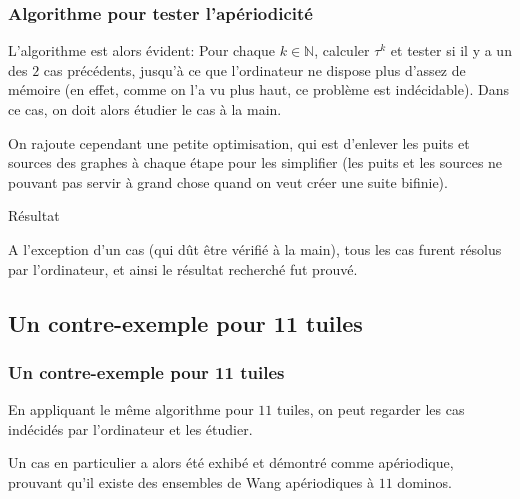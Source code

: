\documentclass{beamer}
\newcommand{\N}{\mathbb N}
\begin{document}
\begin{frame}
\frametitle{Algorithme pour tester l'apériodicité}

L'algorithme est alors évident: Pour chaque $k \in \N$, calculer $\tau^k$ et tester si il y a un des $2$ cas précédents,
jusqu'à ce que l'ordinateur ne dispose plus d'assez de mémoire (en effet, comme on l'a vu plus haut, ce problème est indécidable).
Dans ce cas, on doit alors étudier le cas à la main.

On rajoute cependant une petite optimisation, qui est d'enlever les puits et sources des graphes à chaque étape pour les simplifier
(les puits et les sources ne pouvant pas servir à grand chose quand on veut créer une suite bifinie).

\begin{block}{Résultat}

A l'exception d'un cas (qui dût être vérifié à la main), tous les cas furent résolus par l'ordinateur, et ainsi le résultat recherché fut prouvé.
    
\end{block}

\end{frame}

\subsection{Un contre-exemple pour 11 tuiles}

\begin{frame}
\frametitle{Un contre-exemple pour 11 tuiles}

En appliquant le même algorithme pour $11$ tuiles, on peut regarder les cas indécidés par l'ordinateur et les étudier.

Un cas en particulier a alors été exhibé et démontré comme apériodique, prouvant qu'il existe des ensembles de Wang
apériodiques à $11$ dominos.

\end{frame}
\end{document}
